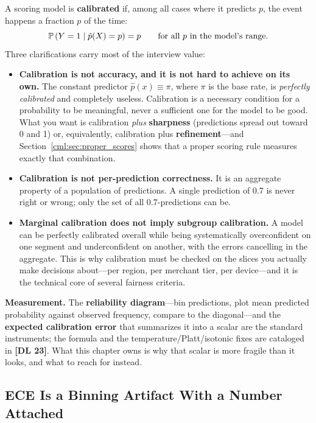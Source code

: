 A scoring model is \textbf{calibrated} if, among all cases where it predicts $p$, the event happens a fraction $p$ of the time:
\begin{equation}
\mathbb{P}\left(Y = 1 \mid \hat p(X) = p\right) = p \qquad \text{for all } p \text{ in the model's range}.
\end{equation}
Three clarifications carry most of the interview value:

\begin{itemize}
    \item \textbf{Calibration is not accuracy, and it is not hard to achieve on its own.} The constant predictor $\hat p(x) \equiv \pi$, where $\pi$ is the base rate, is \textit{perfectly calibrated} and completely useless. Calibration is a necessary condition for a probability to be meaningful, never a sufficient one for the model to be good. What you want is calibration \textit{plus} \textbf{sharpness} (predictions spread out toward 0 and 1) or, equivalently, calibration plus \textbf{refinement}---and Section~\ref{cml:sec:proper_scores} shows that a proper scoring rule measures exactly that combination.
    \item \textbf{Calibration is not per-prediction correctness.} It is an aggregate property of a population of predictions. A single prediction of 0.7 is never right or wrong; only the set of all 0.7-predictions can be.
    \item \textbf{Marginal calibration does not imply subgroup calibration.} A model can be perfectly calibrated overall while being systematically overconfident on one segment and underconfident on another, with the errors cancelling in the aggregate. This is why calibration must be checked on the slices you actually make decisions about---per region, per merchant tier, per device---and it is the technical core of several fairness criteria.
\end{itemize}

\textbf{Measurement.} The \textbf{reliability diagram}---bin predictions, plot mean predicted probability against observed frequency, compare to the diagonal---and the \textbf{expected calibration error} that summarizes it into a scalar are the standard instruments; the formula and the temperature/Platt/isotonic fixes are cataloged in \textbf{[DL 23]}. What this chapter owns is why that scalar is more fragile than it looks, and what to reach for instead.

\subsection{ECE Is a Binning Artifact With a Number Attached}

